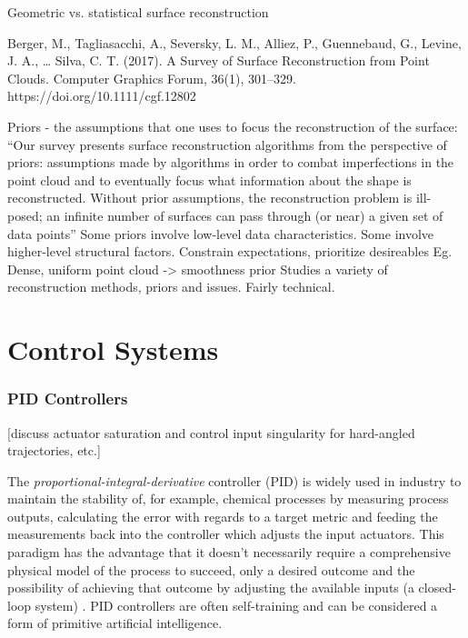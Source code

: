 Geometric vs. statistical surface reconstruction

Berger, M., Tagliasacchi, A., Seversky, L. M., Alliez, P., Guennebaud, G., Levine, J. A., … Silva, C. T. (2017). A Survey of Surface Reconstruction from Point Clouds. Computer Graphics Forum, 36(1), 301–329. https://doi.org/10.1111/cgf.12802

Priors - the assumptions that one uses to focus the reconstruction of the surface:
“Our survey presents surface reconstruction algorithms from the perspective of priors: assumptions made by algorithms in order to combat imperfections in the point cloud and to eventually focus what information about the shape is reconstructed. Without prior assumptions, the reconstruction problem is ill-posed; an infinite number of surfaces can pass through (or near) a given set of data points”
Some priors involve low-level data characteristics. Some involve higher-level structural factors.
Constrain expectations, prioritize desireables
Eg. Dense, uniform point cloud -> smoothness prior
Studies a variety of reconstruction methods, priors and issues. 
Fairly technical.

\section{Control Systems}


\subsubsection{PID Controllers}

[discuss actuator saturation and control input singularity for hard-angled trajectories, etc.]


The \emph{proportional-integral-derivative} controller (PID) is widely used in industry \cite{Soediono1989} to maintain the stability of, for example, chemical processes by measuring process outputs, calculating the error with regards to a target metric and feeding the measurements back into the controller which adjusts the input actuators. This paradigm has the advantage that it doesn’t necessarily require a comprehensive physical model of the process to succeed, only a desired outcome and the possibility of achieving that outcome by adjusting the available inputs (a closed-loop system) \cite{Soediono1989}. PID controllers are often self-training and can be considered a form of primitive artificial intelligence.

